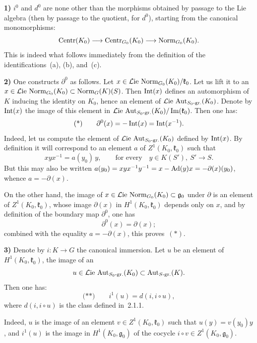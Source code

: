 \noindent\textbf{1)}
\(i^{0}\) and \(d^{0}\) are none other than the morphisms obtained by
passage to the Lie algebra (then by passage to the quotient, for
\(d^{0}\)), starting from the canonical monomorphisms:
\[
\operatorname{Centr}(K_0)\longrightarrow\operatorname{Centr}_{G_0}(K_0)
\longrightarrow\operatorname{Norm}_{G_0}(K_0).
\]
This is indeed what follows immediately from the definition of the
identifications~(a), (b), and~(c).

\noindent\textbf{2)}
One constructs \(\partial^{0}\) as follows. Let
\(x\in\mathcal{L}\mathrm{ie}\,\operatorname{Norm}_{G_0}(K_0)/\mathfrak{k}_0\). Let us
lift it to an
\(x\in\mathcal{L}\mathrm{ie}\,\operatorname{Norm}_{G_0}(K_0)\subset\operatorname{Norm}_{G}(K)(S)\).
Then \(\operatorname{Int}(x)\) defines an automorphism of \(K\) inducing the identity on
\(K_0\), hence an element of
\(\mathcal{L}\mathrm{ie}\,\operatorname{Aut}_{S_0\text{-gr.}}(K_0)\). Denote by
\(\operatorname{Int}(x)\) the image of this element in
\(\mathcal{L}\mathrm{ie}\,\operatorname{Aut}_{S_0\text{-gr.}}(K_0)/\operatorname{Im}(\mathfrak{k}_0)\).
Then one has:
\[
\text{(*)}\qquad
\partial^{0}(x)=-\operatorname{Int}(x)=\operatorname{Int}(x^{-1}).
\]
Indeed, let us compute the element of
\(\mathcal{L}\mathrm{ie}\,\operatorname{Aut}_{S_0\text{-gr.}}(K_0)\) defined by
\(\operatorname{Int}(x)\). By definition it will correspond to an element \(a\) of
\(Z^{1}(K_0,\mathfrak{k}_0)\) such that
\[
xyx^{-1}=a(y_0)\,y,
\qquad\text{for every}\quad y\in K(S'),\ S'\longrightarrow S.
\]
But this may also be written
\(a(y_0)=xyx^{-1}y^{-1}=x-\operatorname{Ad}(y)x=-\partial(x)(y_0)\), whence
\(a=-\partial(x)\).

{\renewcommand{\thefootnote}{(140)}}
On the other hand, the image of
\(x\in\mathcal{L}\mathrm{ie}\,\operatorname{Norm}_{G_0}(K_0)\subset\mathfrak{g}_0\) under
\(\partial\) is an element of \(Z^{1}(K_0,\mathfrak{k}_0)\), whose image
\(\partial(x)\) in \(H^{1}(K_0,\mathfrak{k}_0)\) depends only on \(x\), and
by definition of the boundary map \(\partial^{0}\), one has
\[
\partial^{0}(x)=\partial(x);
\]
combined with the equality \(a=-\partial(x)\), this proves~\((*)\).

\noindent\textbf{3)}
{\renewcommand{\thefootnote}{(141)}}
Denote by \(i\colon K\to G\) the canonical immersion. Let \(u\) be an
element of \(H^{1}(K_0,\mathfrak{k}_0)\), the image of an
\[
u\in\mathcal{L}\mathrm{ie}\,\operatorname{Aut}_{S_0\text{-gr.}}(K_0)
\subset\operatorname{Aut}_{S\text{-gr.}}(K).
\]
Then one has:
\[
\text{(**)}\qquad i^{1}(u)=d(i,i\circ u),
\]
where \(d(i,i\circ u)\) is the class defined in~2.1.1.

Indeed, \(u\) is the image of an element \(v\in Z^{1}(K_0,\mathfrak{k}_0)\)
such that \(u(y)=v(y_0)y\), and \(i^{1}(u)\) is the image in
\(H^{1}(K_0,\mathfrak{g}_0)\) of the cocycle
\(i\circ v\in Z^{1}(K_0,\mathfrak{g}_0)\).

